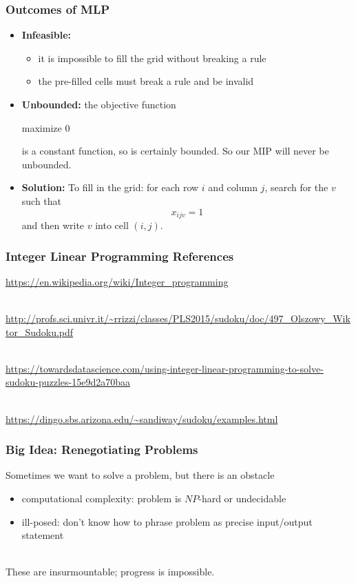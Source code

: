 \documentclass[10pt,aspectratio=169]{beamer}
\newcommand{\stanza}{ \\~\ }
\begin{document}
\begin{frame} \frametitle{Outcomes of MLP}
  \begin{itemize}
  \item \textbf{Infeasible:}
    \begin{itemize}
    \item it is impossible to fill the grid without breaking a rule
    \item the pre-filled cells must break a rule and be invalid
    \end{itemize}
  \item \textbf{Unbounded:} the objective function

    maximize 0

    is a constant function, so is certainly bounded. So our MIP will
    never be unbounded.

  \item \textbf{Solution:} To fill in the grid: for each row $i$ and
    column $j$, search for the $v$ such that
    \[ x_{ijv}=1 \]
    and then write $v$ into cell $(i, j).$

  \end{itemize}
\end{frame}

\begin{frame} \frametitle{Integer Linear Programming References}
  \url{https://en.wikipedia.org/wiki/Integer_programming}
  \stanza
  
  \url{http://profs.sci.univr.it/~rrizzi/classes/PLS2015/sudoku/doc/497_Olszowy_Wiktor_Sudoku.pdf}
  \stanza

  \url{https://towardsdatascience.com/using-integer-linear-programming-to-solve-sudoku-puzzles-15e9d2a70baa}
  \stanza

  \url{https://dingo.sbs.arizona.edu/~sandiway/sudoku/examples.html}
\end{frame}

\begin{frame} \frametitle{Big Idea: Renegotiating Problems}
  Sometimes we want to solve a problem, but there is an obstacle
  \begin{itemize}
    \item computational complexity: problem is $NP$-hard or undecidable
    \item ill-posed: don't know how to phrase problem as precise input/output statement
    \stanza
  \end{itemize}
  
  These are insurmountable; progress is impossible.
  \end{frame}
  
\end{document}
